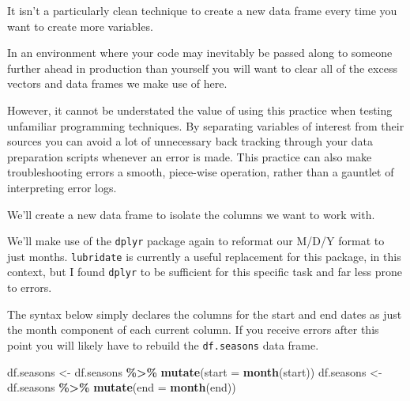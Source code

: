 \documentclass[
  11,
]{book}
\newenvironment{Shaded}{\begin{snugshade}}{\end{snugshade}}
\newcommand{\AttributeTok}[1]{\textcolor[rgb]{0.27,0.27,0.27}{#1}}
\newcommand{\FunctionTok}[1]{\textcolor[rgb]{0.27,0.27,0.27}{\textbf{#1}}}
\newcommand{\NormalTok}[1]{#1}
\newcommand{\OtherTok}[1]{\textcolor[rgb]{0.37,0.37,0.37}{#1}}
\newcommand{\SpecialCharTok}[1]{\textcolor[rgb]{0.43,0.43,0.43}{\textbf{#1}}}
\begin{document}
It isn't a particularly clean technique to create a new data frame every time you want to create more variables.

In an environment where your code may inevitably be passed along to someone further ahead in production than yourself you will want to clear all of the excess vectors and data frames we make use of here.

However, it cannot be understated the value of using this practice when testing unfamiliar programming techniques. By separating variables of interest from their sources you can avoid a lot of unnecessary back tracking through your data preparation scripts whenever an error is made. This practice can also make troubleshooting errors a smooth, piece-wise operation, rather than a gauntlet of interpreting error logs.

We'll create a new data frame to isolate the columns we want to work with.

\begin{Shaded}
\end{Shaded}

We'll make use of the \texttt{dplyr} package again to reformat our M/D/Y format to just months. \texttt{lubridate} is currently a useful replacement for this package, in this context, but I found \texttt{dplyr} to be sufficient for this specific task and far less prone to errors.

The syntax below simply declares the columns for the start and end dates as just the month component of each current column. If you receive errors after this point you will likely have to rebuild the \texttt{df.seasons} data frame.

\begin{Shaded}
\begin{Highlighting}[]
\NormalTok{df.seasons }\OtherTok{\textless{}{-}}\NormalTok{ df.seasons }\SpecialCharTok{\%\textgreater{}\%} \FunctionTok{mutate}\NormalTok{(}\AttributeTok{start =} \FunctionTok{month}\NormalTok{(start))}
\NormalTok{df.seasons }\OtherTok{\textless{}{-}}\NormalTok{ df.seasons }\SpecialCharTok{\%\textgreater{}\%} \FunctionTok{mutate}\NormalTok{(}\AttributeTok{end =} \FunctionTok{month}\NormalTok{(end))}
\end{Highlighting}
\end{Shaded}
\end{document}
